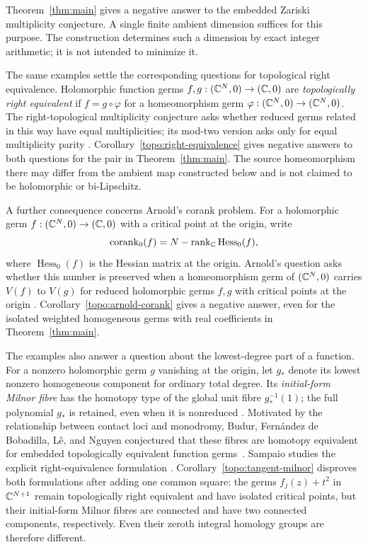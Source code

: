 Theorem~\ref{thm:main} gives a negative answer to the embedded Zariski
multiplicity conjecture. A single finite ambient dimension suffices for
this purpose. The construction determines such a dimension by exact
integer arithmetic; it is not intended to minimize it.

The same examples settle the corresponding questions for topological right
equivalence. Holomorphic function germs $f,g:(\mathbb C^N,0)\to(\mathbb C,0)$ are
\emph{topologically right equivalent} if $f=g\circ\varphi$ for a
homeomorphism germ $\varphi:(\mathbb C^N,0)\to(\mathbb C^N,0)$. The right-topological
multiplicity conjecture asks whether reduced germs related in this way have
equal multiplicities; its mod-two version asks only for equal multiplicity
parity \cite[Conjecture~2 and Conjecture~Z mod~2]{Sampaio2025Milnor}.
Corollary~\ref{topo:right-equivalence} gives negative answers to both
questions for the pair in Theorem~\ref{thm:main}. The source homeomorphism
there may differ from the ambient map constructed below and is not claimed
to be holomorphic or bi-Lipschitz.

A further consequence concerns Arnold's corank problem. For a holomorphic
germ $f:(\mathbb C^N,0)\to(\mathbb C,0)$ with a critical point at the origin, write
\[
 \operatorname{corank}_0(f)
       =N-\operatorname{rank}_{\mathbb C}\operatorname{Hess}_0(f),
\]
where $\operatorname{Hess}_0(f)$ is the Hessian matrix at the origin.
Arnold's question asks whether this number is preserved when a
homeomorphism germ of $(\mathbb C^N,0)$ carries $V(f)$ to $V(g)$ for reduced
holomorphic germs $f,g$ with critical points at the origin
\cite[Problem~1]{Sampaio2026}. Corollary~\ref{topo:arnold-corank} gives
a negative answer, even for the isolated weighted homogeneous germs
with real coefficients in Theorem~\ref{thm:main}.

The examples also answer a question about the lowest-degree part of a
function. For a nonzero holomorphic germ $g$ vanishing at the origin,
let $g_*$ denote its lowest nonzero homogeneous component for ordinary
total degree. Its \emph{initial-form Milnor fibre} has the homotopy type
of the global unit fibre $g_*^{-1}(1)$; the full polynomial $g_*$ is
retained, even when it is nonreduced
\cite[Proposition~1.6 in arXiv v3]{BudurEtAl2022ContactLoci}.
Motivated by the relationship between contact loci and monodromy,
Budur, Fern\'andez de Bobadilla, L\^e, and Nguyen conjectured that these
fibres are homotopy equivalent for embedded topologically equivalent
function germs~\cite[Conjecture~1.7 in arXiv v3]{BudurEtAl2022ContactLoci}.
Sampaio studies the explicit right-equivalence formulation
\cite[Conjecture~4]{Sampaio2025Milnor}.
Corollary~\ref{topo:tangent-milnor} disproves both formulations after adding one common
square: the germs $f_j(z)+t^2$ in $\mathbb C^{N+1}$ remain topologically right
equivalent and have isolated critical points, but their initial-form Milnor fibres are
connected and have two connected components, respectively. Even their
zeroth integral homology groups are therefore different.

